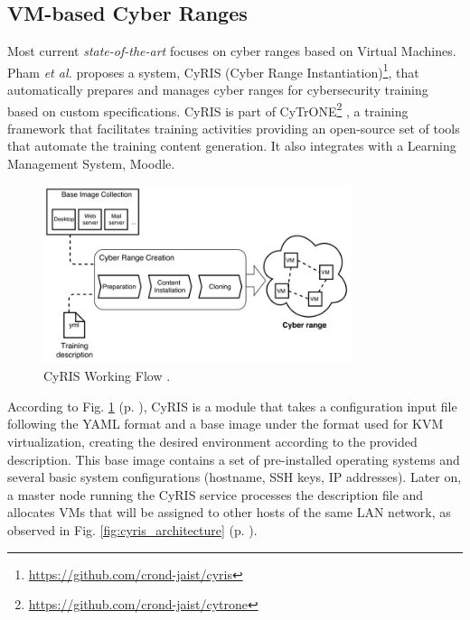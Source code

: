 \subsection{VM-based Cyber Ranges} \label{sec:vm_cr}


Most current \textit{state-of-the-art} focuses on cyber ranges based on Virtual Machines. Pham \textit{et al.} \cite{cyris_ref} proposes a system, CyRIS (Cyber Range Instantiation)\footnote{\url{https://github.com/crond-jaist/cyris}}, that automatically prepares and manages cyber ranges for cybersecurity training based on custom specifications. CyRIS is part of CyTrONE\footnote{\url{https://github.com/crond-jaist/cytrone}} \cite{cytrone_ref}, a training framework that facilitates training activities providing an open-source set of tools that automate the training content generation. It also integrates with a Learning Management System, Moodle. 

\begin{figure}[ht]
    \includegraphics[width=9cm]{figures/cyris_workflow.png}
    \caption{CyRIS Working Flow \cite{cyris_ref}.}
    \label{fig:cyris_workflow}
\end{figure}

According to Fig. \ref{fig:cyris_workflow} (p. \pageref{fig:cyris_workflow}), CyRIS is a module that takes a configuration input file following the YAML format and a base image under the format used for KVM virtualization, creating the desired environment according to the provided description. This base image contains a set of pre-installed operating systems and several basic system configurations (hostname, SSH keys, IP addresses). Later on, a master node running the CyRIS service processes the description file and allocates VMs that will be assigned to other hosts of the same LAN network, as observed in Fig. \ref{fig:cyris_architecture} (p. \pageref{fig:cyris_architecture}).

